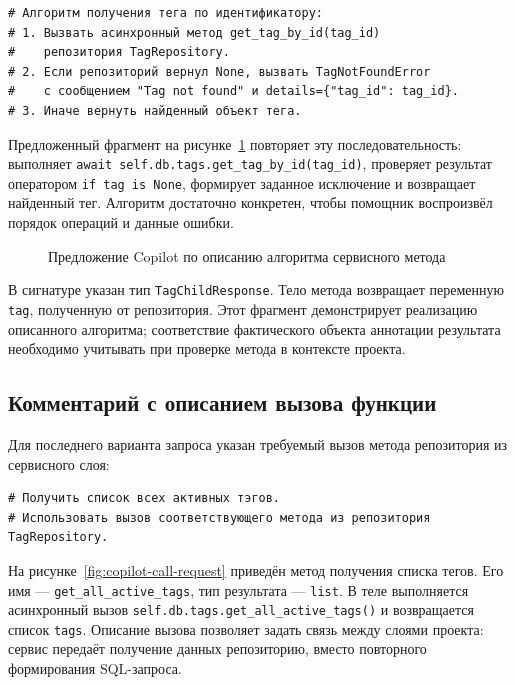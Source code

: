\begingroup
\small
\renewcommand{\ttdefault}{\rmdefault}
\begin{verbatim}
# Алгоритм получения тега по идентификатору:
# 1. Вызвать асинхронный метод get_tag_by_id(tag_id)
#    репозитория TagRepository.
# 2. Если репозиторий вернул None, вызвать TagNotFoundError
#    с сообщением "Tag not found" и details={"tag_id": tag_id}.
# 3. Иначе вернуть найденный объект тега.
\end{verbatim}
\endgroup

Предложенный фрагмент на рисунке~\ref{fig:copilot-algorithm-request}
повторяет эту последовательность: выполняет
\verb|await self.db.tags.get_tag_by_id(tag_id)|, проверяет результат
оператором \verb|if tag is None|, формирует заданное исключение
и возвращает найденный тег. Алгоритм достаточно конкретен, чтобы
помощник воспроизвёл порядок операций и данные ошибки.

\begin{figure}[H]
	\centering
	\caption{Предложение Copilot по описанию алгоритма сервисного метода}
	\label{fig:copilot-algorithm-request}
\end{figure}

В сигнатуре указан тип \verb|TagChildResponse|.
Тело метода возвращает переменную \verb|tag|, полученную от репозитория.
Этот фрагмент демонстрирует
реализацию описанного алгоритма; соответствие фактического объекта
аннотации результата необходимо учитывать при проверке метода
в контексте проекта.

\subsection{Комментарий с описанием вызова функции}

Для последнего варианта запроса указан требуемый вызов метода
репозитория из сервисного слоя:

\begingroup
\small
\renewcommand{\ttdefault}{\rmdefault}
\begin{verbatim}
# Получить список всех активных тэгов.
# Использовать вызов соответствующего метода из репозитория TagRepository.
\end{verbatim}
\endgroup

На рисунке~\ref{fig:copilot-call-request} приведён метод получения списка тегов.
Его имя --- \verb|get_all_active_tags|, тип результата --- \verb|list|.
В теле выполняется асинхронный вызов
\verb|self.db.tags.get_all_active_tags()| и возвращается список \verb|tags|.
Описание вызова позволяет
задать связь между слоями проекта: сервис передаёт получение данных
репозиторию, вместо повторного формирования SQL-запроса.

